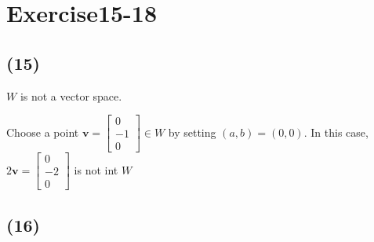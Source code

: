 \documentclass{jsarticle}
\begin{document}
\section{Exercise15-18}
\subsection{(15)}
$W$ is not a vector space.

Choose a point $ \bm{v} = \left[ \begin{array}{c} 0 \\ -1 \\ 0 \end{array} \right] \in W $ by setting $(a,b)=(0,0)$.
        In this case, $ 2\bm{v} = \left[ \begin{array}{c} 0 \\ -2 \\ 0 \end{array} \right] $ is not int $W$

\subsection{(16)}
\end{document}

